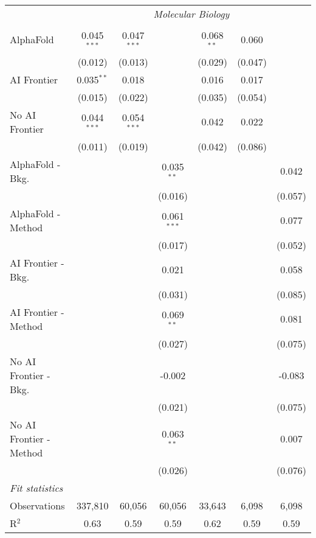 \begin{tabular}{lcccccc}
 & \multicolumn{6}{c}{\textit{Molecular Biology}} \\ \\
   AlphaFold               & 0.045$^{***}$ & 0.047$^{***}$ &               & 0.068$^{**}$ & 0.060   &   \\   
                           & (0.012)       & (0.013)       &               & (0.029)      & (0.047) &   \\   
   AI Frontier             & 0.035$^{**}$  & 0.018         &               & 0.016        & 0.017   &   \\   
                           & (0.015)       & (0.022)       &               & (0.035)      & (0.054) &   \\   
   No AI Frontier          & 0.044$^{***}$ & 0.054$^{***}$ &               & 0.042        & 0.022   &   \\   
                           & (0.011)       & (0.019)       &               & (0.042)      & (0.086) &   \\   
   AlphaFold - Bkg.        &               &               & 0.035$^{**}$  &              &         & 0.042\\   
                           &               &               & (0.016)       &              &         & (0.057)\\   
   AlphaFold - Method      &               &               & 0.061$^{***}$ &              &         & 0.077\\   
                           &               &               & (0.017)       &              &         & (0.052)\\   
   AI Frontier - Bkg.      &               &               & 0.021         &              &         & 0.058\\   
                           &               &               & (0.031)       &              &         & (0.085)\\   
   AI Frontier - Method    &               &               & 0.069$^{**}$  &              &         & 0.081\\   
                           &               &               & (0.027)       &              &         & (0.075)\\   
   No AI Frontier - Bkg.   &               &               & -0.002        &              &         & -0.083\\   
                           &               &               & (0.021)       &              &         & (0.075)\\   
   No AI Frontier - Method &               &               & 0.063$^{**}$  &              &         & 0.007\\   
                           &               &               & (0.026)       &              &         & (0.076)\\   
   \midrule
   \emph{Fit statistics}\\
   Observations            & 337,810       & 60,056        & 60,056        & 33,643       & 6,098   & 6,098\\  
   R$^2$                   & 0.63          & 0.59          & 0.59          & 0.62         & 0.59    & 0.59\\  
   

\end{tabular}
